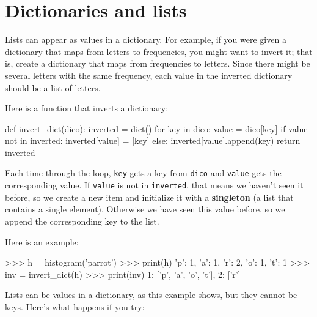 \section{Dictionaries and lists}

Lists can appear as values in a dictionary.  For example, if you
were given a dictionary that maps from letters to frequencies, you
might want to invert it; that is, create a dictionary that maps
from frequencies to letters.  Since there might be several letters
with the same frequency, each value in the inverted dictionary
should be a list of letters.


Here is a function that inverts a dictionary:

\beforeverb
\begin{pycode}
def invert_dict(dico):
    inverted = dict()
    for key in dico:
        value = dico[key]
        if value not in inverted:
            inverted[value] = [key]
        else:
            inverted[value].append(key)
    return inverted
\end{pycode}
\afterverb
%
Each time through the loop, {\tt key} gets a key from {\tt dico} and 
{\tt value} gets the corresponding value.  If {\tt value} is not in {\tt inverted},
that means we haven't seen it before, so we create a new item and
initialize it with a {\bf singleton} (a list that contains a
single element).  Otherwise we have seen this value before, so we
append the corresponding key to the list.


Here is an example:

\beforeverb
\begin{pyinterpreter}
>>> h = histogram('parrot')
>>> print(h)
{'p': 1, 'a': 1, 'r': 2, 'o': 1, 't': 1}
>>> inv = invert_dict(h)
>>> print(inv)
{1: ['p', 'a', 'o', 't'], 2: ['r']}
\end{pyinterpreter}
\afterverb
%
%

Lists can be values in a dictionary, as this example shows, but they
cannot be keys.  Here's what happens if you try:
%
%

